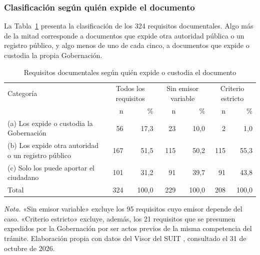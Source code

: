 \subsubsection{Clasificación según quién expide el documento}

La Tabla~\ref{tab:categorias} presenta la clasificación de los 324 requisitos documentales. Algo más de la mitad corresponde a documentos que expide otra autoridad pública o un registro público, y algo menos de uno de cada cinco, a documentos que expide o custodia la propia Gobernación.

\begin{table}[htbp]
\centering
\caption{Requisitos documentales según quién expide o custodia el documento}
\label{tab:categorias}
\begin{tabular}{p{5.6cm}rrrrrr}
\hline
Categoría & \multicolumn{2}{c}{Todos los requisitos} & \multicolumn{2}{c}{Sin emisor variable} & \multicolumn{2}{c}{Criterio estricto} \\
 & n & \% & n & \% & n & \% \\
\hline
(a) Los expide o custodia la Gobernación & 56 & 17,3 & 23 & 10,0 & 2 & 1,0 \\
(b) Los expide otra autoridad o un registro público & 167 & 51,5 & 115 & 50,2 & 115 & 55,3 \\
(c) Solo los puede aportar el ciudadano & 101 & 31,2 & 91 & 39,7 & 91 & 43,8 \\
\hline
Total & 324 & 100,0 & 229 & 100,0 & 208 & 100,0 \\
\hline
\end{tabular}

\smallskip
\footnotesize\textit{Nota.} «Sin emisor variable» excluye los 95 requisitos cuyo emisor depende del caso. «Criterio estricto» excluye, además, los 21 requisitos que se presumen expedidos por la Gobernación por ser actos previos de la misma competencia del trámite. Elaboración propia con datos del Visor del SUIT \parencite{funcionpublica2026visorsuit}, consultado el 31 de octubre de 2026.
\end{table}

